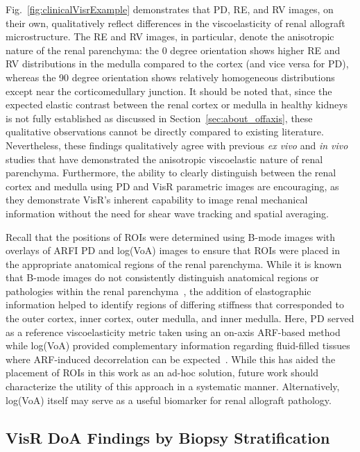 Fig.~\ref{fig:clinicalVisrExample} demonstrates that PD, RE, and RV images, on their own, qualitatively reflect differences in the viscoelasticity of renal allograft microstructure. The RE and RV images, in particular, denote the anisotropic nature of the renal parenchyma: the 0 degree orientation shows higher RE and RV distributions in the medulla compared to the cortex (and vice versa for PD), whereas the 90 degree orientation shows relatively homogeneous distributions except near the corticomedullary junction. It should be noted that, since the expected elastic contrast between the renal cortex or medulla in healthy kidneys is not fully established as discussed in Section~\ref{sec:about_offaxis}, these qualitative observations cannot be directly compared to existing literature. Nevertheless, these findings qualitatively agree with previous \emph{ex vivo} and \emph{in vivo} studies that have demonstrated the anisotropic viscoelastic nature of renal parenchyma. Furthermore, the ability to clearly distinguish between the renal cortex and medulla using PD and VisR parametric images are encouraging, as they demonstrate VisR's inherent capability to image renal mechanical information without the need for shear wave tracking and spatial averaging.

Recall that the positions of ROIs were determined using B-mode images with overlays of ARFI PD and log(VoA) images to ensure that ROIs were placed in the appropriate anatomical regions of the renal parenchyma. While it is known that B-mode images do not consistently distinguish anatomical regions or pathologies within the renal parenchyma~\cite{rodgers_Ultrasonographic_2014,cloutier_Quantitative_2021}, the addition of elastographic information helped to identify regions of differing stiffness that corresponded to the outer cortex, inner cortex, outer medulla, and inner medulla. Here, PD served as a reference viscoelasticity metric taken using an on-axis ARF-based method while log(VoA) provided complementary information regarding fluid-filled tissues where ARF-induced decorrelation can be expected~\cite{torres_Delineation_2019,anand_Comparing_2023,qazi_Comparison_2025}. While this has aided the placement of ROIs in this work as an ad-hoc solution, future work should characterize the utility of this approach in a systematic manner. Alternatively, log(VoA) itself may serve as a useful biomarker for renal allograft pathology.

\subsection{VisR DoA Findings by Biopsy Stratification}


